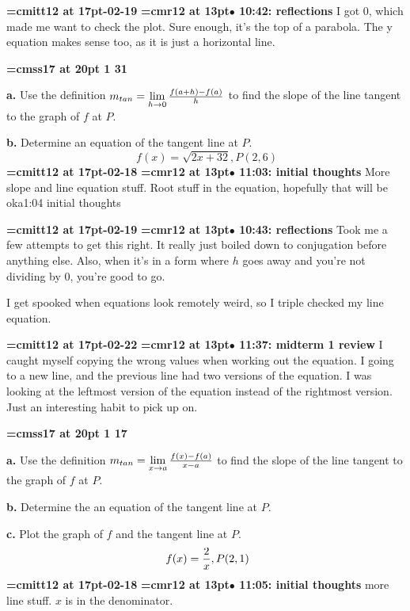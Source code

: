{\medskip\noindent\bf\font\titlefont=cmitt12 at 17pt-02-19}\medskip
{\smallskip\noindent\bf\font\titlefont=cmr12 at 13pt\titlefont $\bullet$ 10:42: reflections}\smallskip
I got 0, which made me want to check the plot. Sure enough, it's the top of a parabola. The y equation makes sense too, as it is just a horizontal line.
\par

{\medskip\noindent\bf\font\titlefont=cmss17 at 20pt 1 31}\medskip
\par {\bf a.} Use the definition
$m_{tan} = \lim\limits_{h \to 0}{f(a + h) - f(a) \over h}$
to find the slope of the line tangent to the graph of $f$ at $P$.
\par {\bf b.} Determine an equation of the tangent line at $P$.
$$\
f(x) = \sqrt{2x + 32}, P(2, 6)
$$
{\medskip\noindent\bf\font\titlefont=cmitt12 at 17pt-02-18}\medskip
{\smallskip\noindent\bf\font\titlefont=cmr12 at 13pt\titlefont $\bullet$ 11:03: initial thoughts}\smallskip
More slope and line equation stuff. Root stuff in the equation, hopefully that will be oka1:04 initial thoughts
\par

{\medskip\noindent\bf\font\titlefont=cmitt12 at 17pt-02-19}\medskip
{\smallskip\noindent\bf\font\titlefont=cmr12 at 13pt\titlefont $\bullet$ 10:43: reflections}\smallskip
Took me a few attempts to get this right. It really just boiled down to conjugation before anything else. Also, when it's in a form where $h$ goes away and you're not dividing by 0, you're good to go.
\par

I get spooked when equations look remotely weird, so I triple checked my line equation.
\par

{\medskip\noindent\bf\font\titlefont=cmitt12 at 17pt-02-22}\medskip
{\smallskip\noindent\bf\font\titlefont=cmr12 at 13pt\titlefont $\bullet$ 11:37: midterm 1 review}\smallskip
I caught myself copying the wrong values when working out the equation. I going to a new line, and the previous line had two versions of the equation. I was looking at the leftmost version of the equation instead of the rightmost version. Just an interesting habit to pick up on.
\par

{\medskip\noindent\bf\font\titlefont=cmss17 at 20pt 1 17}\medskip
\par {\bf a.} Use the definition $m_{tan} = \lim\limits_{x \to a} {f(x) - f(a) \over x - a}$
to find the slope of the line tangent to the graph of $f$
at $P$.
\par {\bf b.} Determine the an equation of the tangent line at $P$.
\par {\bf c.} Plot the graph of $f$ and the tangent line at $P$.
$$\
f(x) = {2 \over x}, P(2, 1)
$$
{\medskip\noindent\bf\font\titlefont=cmitt12 at 17pt-02-18}\medskip
{\smallskip\noindent\bf\font\titlefont=cmr12 at 13pt\titlefont $\bullet$ 11:05: initial thoughts}\smallskip
more line stuff. $x$ is in the denominator.
\par

